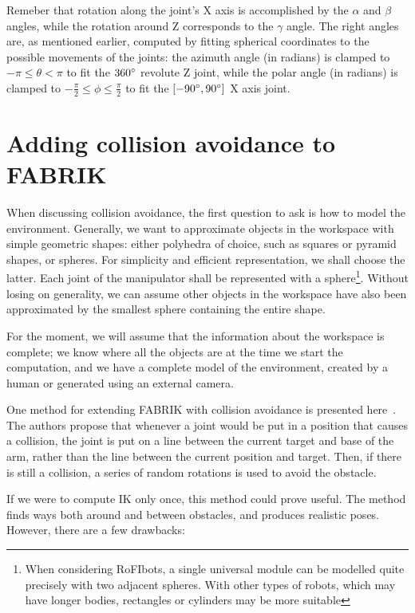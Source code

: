 Remeber that rotation along the joint's X axis is accomplished by the $\alpha$ and $\beta$ angles, while the rotation around Z corresponds to the $\gamma$ angle. The right angles are, as mentioned earlier, computed by fitting spherical coordinates to the possible movements of the joints: the azimuth angle (in radians) is clamped to $-\pi \le \theta < \pi$ to fit the $360\degree$ revolute Z joint, while the polar angle (in radians) is clamped to $-\frac{\pi}{2} \le \phi \le \frac{\pi}{2}$ to fit the $\left[-90\degree, 90\degree\right]$ X axis joint.

\section{Adding collision avoidance to FABRIK}

When discussing collision avoidance, the first question to ask is how to model the environment. Generally, we want to approximate objects in the workspace with simple geometric shapes: either polyhedra of choice, such as squares or pyramid shapes, or spheres. For simplicity and efficient representation, we shall choose the latter. Each joint of the manipulator shall be represented with a sphere\footnote{When considering RoFIbots, a single universal module can be modelled quite precisely with two adjacent spheres. With other types of robots, which may have longer bodies, rectangles or cylinders may be more suitable}. Without losing on generality, we can assume other objects in the workspace have also been approximated by the smallest sphere containing the entire shape.

For the moment, we will assume that the information about the workspace is complete; we know where all the objects are at the time we start the computation, and we have a complete model of the environment, created by a human or generated using an external camera.

One method for extending FABRIK with collision avoidance is presented here~\cite{fabrikAvoidance}. The authors propose that whenever a joint would be put in a position that causes a collision, the joint is put on a line between the current target and base of the arm, rather than the line between the current position and target. Then, if there is still a collision, a series of random rotations is used to avoid the obstacle.

If we were to compute IK only once, this method could prove useful. The method finds ways both around and between obstacles, and produces realistic poses. However, there are a few drawbacks:

